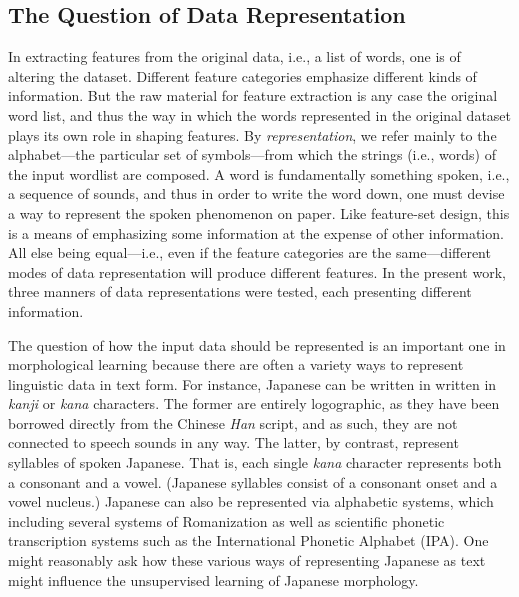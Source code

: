 \subsection{The Question of Data Representation} 
In extracting features from the original data, i.e., a list of words, one is of altering the dataset. Different feature categories emphasize different kinds of information. But the raw material for feature extraction is any case the original word list, and thus the way in which the words represented in the original dataset plays its own role in shaping features. 
By \emph{representation}, we refer mainly to the alphabet---the
particular set of symbols---from which the strings (i.e., words) of the input wordlist 
are composed.  A word is fundamentally something spoken, i.e., a sequence of sounds, and thus in order to write the word down, one must devise a way to represent the spoken phenomenon on paper. Like feature-set design, this is a means of emphasizing some information at the expense of other information. All else being equal---i.e., even if the feature categories are the same---different modes of data representation will produce different features.  
In the present work, three manners of data representations were tested, each presenting 
different information. 

The question of how the input data should be represented is an important one in morphological learning because there are often 
a variety ways to represent linguistic data in text form. 
For instance, Japanese can be written in written in \textit{kanji} or 
\textit{kana} characters. The former are entirely logographic, as they 
have been borrowed directly from the Chinese \textit{Han} script, 
and as such, they are not connected to speech sounds in any way. The latter, by contrast,
represent syllables of spoken Japanese. That is, each single \textit{kana} 
character represents both a consonant and a vowel.  (Japanese syllables consist of a consonant onset and a vowel nucleus.)  Japanese can also be represented via alphabetic systems, which including several systems of Romanization as well as scientific phonetic transcription systems such as the International Phonetic Alphabet (IPA).  One might reasonably ask how these various ways of representing Japanese as text might influence the unsupervised learning of Japanese morphology.

